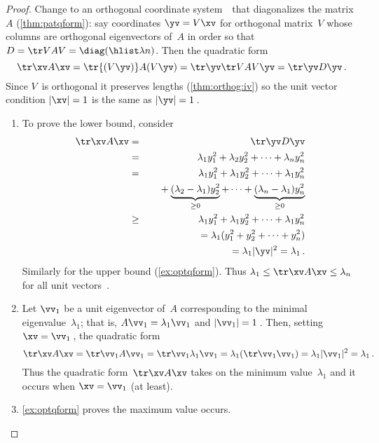 \begin{proof} 
Change to an orthogonal coordinate system~\yv\ that diagonalizes the matrix~\(A\) (\autoref{thm:patqform}): say coordinates \(\yv=V\xv\) for orthogonal matrix~\(V\) whose columns are orthogonal eigenvectors of~\(A\) in order so that \(D=\tr VAV=\diag(\hlist\lambda n)\).
Then the quadratic form 
\begin{equation*}
\tr\xv A\xv=\tr{(V\yv)} A(V\yv)=\tr\yv \tr VAV\yv=\tr\yv D\yv\,.
\end{equation*}
Since \(V\)~is orthogonal it preserves lengths (\autoref{thm:orthog:iv}) so the unit vector condition \(|\xv|=1\) is the same as \(|\yv|=1\)\,.
\begin{enumerate}
\item To prove the lower bound, consider
\begin{eqnarray*}
\tr\xv A\xv&=&\tr\yv D\yv
\\&=&\lambda_1y_1^2+\lambda_2y_2^2+\cdots+\lambda_ny_n^2
\\&=&\lambda_1y_1^2+\lambda_1y_2^2+\cdots+\lambda_1y_n^2
\\&&\quad{}
+\underbrace{(\lambda_2-\lambda_1)y_2^2}_{\geq0}
+\cdots+\underbrace{(\lambda_n-\lambda_1)y_n^2}_{\geq0}
\\&\geq&\lambda_1y_1^2+\lambda_1y_2^2+\cdots+\lambda_1y_n^2
\\&&{}=\lambda_1(y_1^2+y_2^2+\cdots+y_n^2)
\\&&{}=\lambda_1|\yv|^2
=\lambda_1\,.
\end{eqnarray*}
Similarly for the upper bound (\autoref{ex:optqform}).  
Thus \(\lambda_1\leq \tr\xv A\xv\leq\lambda_n\) for all unit vectors~\xv.

\item Let \(\vv_1\) be a unit eigenvector of~\(A\) corresponding to the minimal eigenvalue~\(\lambda_1\); that is, \(A\vv_1=\lambda_1\vv_1\) and \(|\vv_1|=1\)\,.
Then, setting \(\xv=\vv_1\)\,, the quadratic form
\begin{equation*}
\tr\xv A\xv=\tr\vv_1A\vv_1
=\tr\vv_1\lambda_1\vv_1
=\lambda_1(\tr\vv_1\vv_1)
=\lambda_1|\vv_1|^2
=\lambda_1\,.
\end{equation*}
Thus the quadratic form~\(\tr\xv A\xv\) takes on the minimum value~\(\lambda_1\) and it occurs when \(\xv=\vv_1\) (at least).

\item \autoref{ex:optqform} proves the maximum value occurs.
\end{enumerate}
\end{proof}


